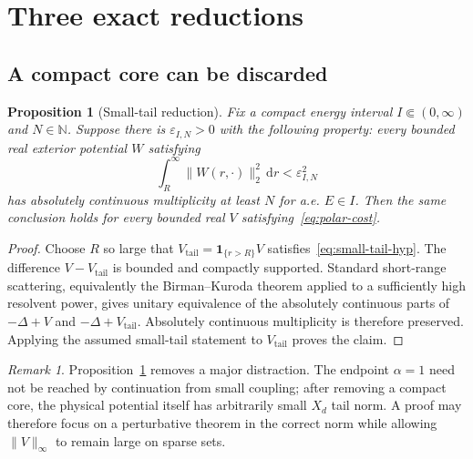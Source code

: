 \documentclass[11pt]{article}
\newcommand{\N}{\mathbb N}
\newcommand{\dd}{\,\mathrm d}
\newcommand{\eps}{\varepsilon}
\newtheorem{proposition}[theorem]{Proposition}
\theoremstyle{definition}
\theoremstyle{remark}
\newtheorem{remark}[theorem]{Remark}
\begin{document}
\section{Three exact reductions}

\subsection{A compact core can be discarded}

\begin{proposition}[Small-tail reduction]\label{prop:small-tail}
Fix a compact energy interval $I\Subset(0,\infty)$ and $N\in\N$.  Suppose there is $\eps_{I,N}>0$ with the following property: every bounded real exterior potential $W$ satisfying
\begin{equation}
 \int_R^\infty\|W(r,\cdot)\|_2^2\dd r<\eps_{I,N}^2
 \label{eq:small-tail-hyp}
\end{equation}
has absolutely continuous multiplicity at least $N$ for a.e. $E\in I$.  Then the same conclusion holds for every bounded real $V$ satisfying~\eqref{eq:polar-cost}.
\end{proposition}

\begin{proof}
Choose $R$ so large that $V_{\mathrm{tail}}=\mathbf1_{\{r>R\}}V$ satisfies~\eqref{eq:small-tail-hyp}.  The difference $V-V_{\mathrm{tail}}$ is bounded and compactly supported.  Standard short-range scattering, equivalently the Birman--Kuroda theorem applied to a sufficiently high resolvent power, gives unitary equivalence of the absolutely continuous parts of $-\Delta+V$ and $-\Delta+V_{\mathrm{tail}}$.  Absolutely continuous multiplicity is therefore preserved.  Applying the assumed small-tail statement to $V_{\mathrm{tail}}$ proves the claim.
\end{proof}

\begin{remark}
Proposition~\ref{prop:small-tail} removes a major distraction.  The endpoint $\alpha=1$ need not be reached by continuation from small coupling; after removing a compact core, the physical potential itself has arbitrarily small $X_d$ tail norm.  A proof may therefore focus on a perturbative theorem in the correct norm while allowing $\|V\|_\infty$ to remain large on sparse sets.
\end{remark}
\end{document}
